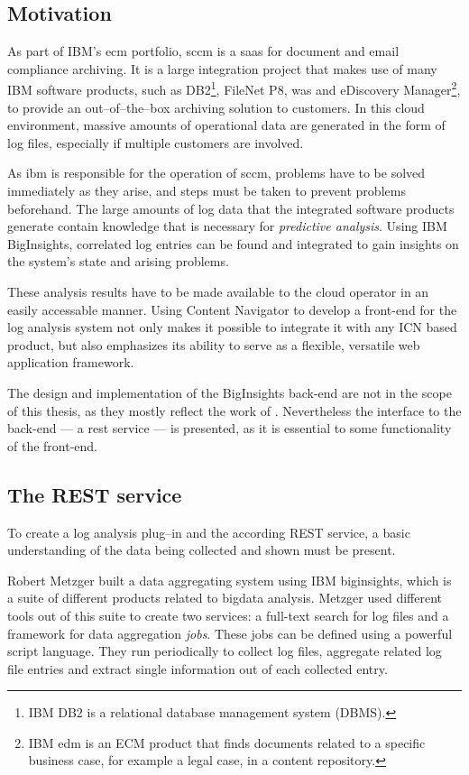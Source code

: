 \subsection{Motivation}
As part of IBM's \ac{ecm} portfolio, \acl{sccm} is a \acl{saas} for document and email compliance archiving. It is a large integration project that makes use of many IBM software products, such as DB2\footnote{IBM DB2 is a relational database management system (DBMS).}, FileNet P8, \acl{was} and eDiscovery Manager\footnote{IBM \ac{edm} is an ECM product that finds documents related to a specific business case, for example a legal case, in a content repository.}, to provide an out--of--the--box archiving solution to customers. In this cloud environment, massive amounts of operational data are generated in the form of log files, especially if multiple customers are involved.

As \ac{ibm} is responsible for the operation of \ac{sccm}, problems have to be solved immediately as they arise, and steps must be taken to prevent problems beforehand. The large amounts of log data that the integrated software products generate contain knowledge that is necessary for \emph{predictive analysis}. Using IBM BigInsights, correlated log entries can be found and integrated to gain insights on the system's state and arising problems.

These analysis results have to be made available to the cloud operator in an easily accessable manner. Using Content Navigator to develop a front-end for the log analysis system not only makes it possible to integrate it with any ICN based product, but also emphasizes its ability to serve as a flexible, versatile web application framework.

The design and implementation of the BigInsights back-end are not in the scope of this thesis, as they mostly reflect the work of . Nevertheless the interface to the back-end --- a \ac{rest} service --- is presented, as it is essential to some functionality of the front-end.

\subsection{The REST service}
To create a log analysis plug--in and the according REST service, a basic understanding of the data being collected and shown must be present.

Robert Metzger built a data aggregating system using IBM \gls{biginsights}, which is a suite of different products related to \gls{bigdata} analysis. Metzger used different tools out of this suite to create two services: a full-text search for log files and a framework for data aggregation \emph{jobs}. These jobs can be defined using a powerful script language. They run periodically to collect log files, aggregate related log file entries and extract single information out of each collected entry.


